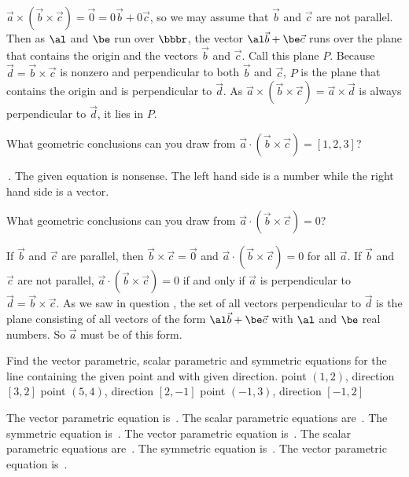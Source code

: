 {$\vec a\times(\vec b\times\vec c)=\vec 0=0\vec b+0\vec c$, so we may assume
that $\vec b$ and $\vec c$ are not parallel. Then as $\al$ and $\be$ run
over $\bbbr$, the vector $\al\vec b+\be \vec c$ runs over the plane that
contains the origin and the vectors $\vec b$ and $\vec c$. Call this plane
$P$. Because
$\vec d=\vec b\times\vec c$ is nonzero and perpendicular to both 
$\vec b$ and $\vec c$, $P$ is the plane that contains the origin
and is perpendicular to $\vec d$. As $\vec a\times(\vec
b\times\vec c)=\vec a\times\vec d$ is always perpendicular to $\vec d$,
it lies in $P$.
\medskip
\item{\next} What geometric conclusions can you draw from
$\vec a\cdot(\vec b\times\vec c)=[1,2,3]$?
\smallskip
\item{}\soln {}$\,$. The given equation is nonsense. The left hand side is
a number while the right hand side is a vector.
\medskip
\item{\next} What geometric conclusions can you draw from
$\vec a\cdot(\vec b\times\vec c)=0$?
\smallskip
\item{}\soln If $\vec b$ and $\vec c$ are parallel, then $\vec b\times\vec c=\vec 0$
and $\vec a\cdot(\vec b\times\vec c)=0$ for all $\vec a$.
If $\vec b$ and $\vec c$ are not parallel, $\vec a\cdot(\vec b\times\vec c)=0$ 
if and only if $\vec a$ is perpendicular to $\vec d=\vec b\times\vec c$.
As we saw in question \Qnine, the set of all vectors perpendicular to
$\vec d$ is the plane consisting of all vectors of the form  
$\al\vec b+\be\vec c$ with $\al$ and $\be$ real numbers. So $\vec a$ must
be of this form.
\medskip
\item{\next} Find the vector parametric, scalar parametric
 and symmetric equations for the line
containing the given point and with given direction.
 point $(1,2)$, direction $[3,2]$
 point $(5,4)$, direction $[2,-1]$
 point $(-1,3)$, direction $[-1,2]$
\smallskip
\item{}\soln 
{}
The vector parametric equation is $\,.$
The scalar parametric equations are $\,.$
The symmetric equation is $\,.$
The vector parametric equation is $\,.$
The scalar parametric equations are $\,.$
The symmetric equation is $\,.$
The vector parametric equation is $\,.$
}
